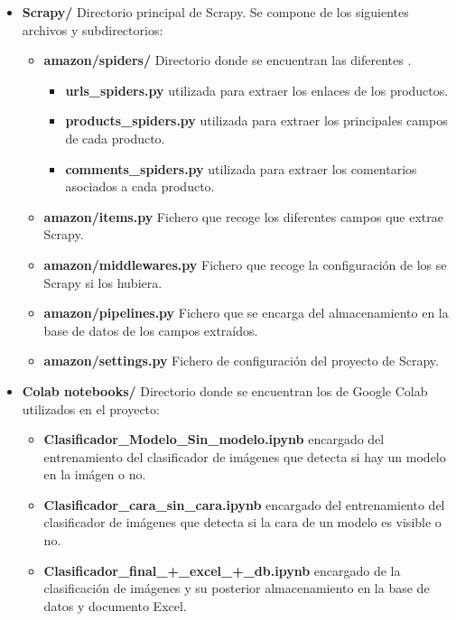 \begin{itemize}
    \item \textbf{Scrapy/} Directorio principal de Scrapy. Se compone de los siguientes archivos y subdirectorios:
        \begin{itemize}
            \item \textbf{amazon/spiders/} Directorio donde se encuentran las diferentes .
                \begin{itemize}
                    \item \textbf{urls\_spiders.py}  utilizada para extraer los enlaces de los productos.
                    \item \textbf{products\_spiders.py}  utilizada para extraer los principales campos de cada producto.
                    \item \textbf{comments\_spiders.py}  utilizada para extraer los comentarios asociados a cada producto.
                \end{itemize}
            \item \textbf{amazon/items.py} Fichero que recoge los diferentes campos que extrae Scrapy.
            \item \textbf{amazon/middlewares.py} Fichero que recoge la configuración de los  se Scrapy si los hubiera.
            \item \textbf{amazon/pipelines.py} Fichero que se encarga del almacenamiento en la base de datos de los campos extraídos.
            \item \textbf{amazon/settings.py} Fichero de configuración del proyecto de Scrapy.
        \end{itemize}
    \item \textbf{Colab notebooks/} Directorio donde se encuentran los  de Google Colab utilizados en el proyecto:
        \begin{itemize}
            \item \textbf{Clasificador\_Modelo\_Sin\_modelo.ipynb}  encargado del entrenamiento del clasificador de  imágenes que detecta si hay un modelo en la imágen o no.
            \item \textbf{Clasificador\_cara\_sin\_cara.ipynb}  encargado del entrenamiento del clasificador de  imágenes que detecta si la cara de un modelo es visible o no.
            \item \textbf{Clasificador\_final\_+\_excel\_+\_db.ipynb}  encargado de la clasificación de imágenes y su posterior almacenamiento en la base de datos y documento Excel.

\end{itemize}
\end{itemize}
